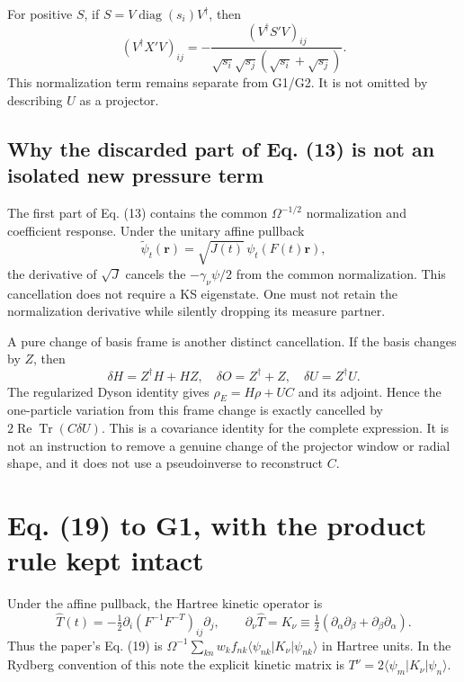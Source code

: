 \documentclass[11pt]{article}
\newcommand{\Tr}{\operatorname{Tr}}
\newcommand{\Rea}{\operatorname{Re}}
\begin{document}
For positive $S$, if $S=V\operatorname{diag}(s_i)V^\dagger$, then
\begin{equation}
 (V^\dagger X'V)_{ij}=-\frac{(V^\dagger S'V)_{ij}}
 {\sqrt{s_i}\sqrt{s_j}(\sqrt{s_i}+\sqrt{s_j})}.
\end{equation}
This normalization term remains separate from G1/G2. It is not omitted by describing $U$ as a projector.

\subsection{Why the discarded part of Eq. (13) is not an isolated new pressure term}
The first part of Eq. (13) contains the common $\Omega^{-1/2}$ normalization and coefficient response. Under the unitary affine pullback
\begin{equation}
 \widetilde\psi_t(\bm r)=\sqrt{J(t)}\,\psi_t(F(t)\bm r),
\end{equation}
the derivative of $\sqrt J$ cancels the $-\gamma_\nu\psi/2$ from the common normalization. This cancellation does not require a KS eigenstate. One must not retain the normalization derivative while silently dropping its measure partner.

A pure change of basis frame is another distinct cancellation. If the basis changes by $Z$, then
\begin{equation}
 \delta H=Z^\dagger H+HZ,\quad\delta O=Z^\dagger+Z,\quad\delta U=Z^\dagger U .
\end{equation}
The regularized Dyson identity gives $\rho_E=H\rho+UC$ and its adjoint. Hence the one-particle variation from this frame change is exactly cancelled by $2\Rea\Tr(C\delta U)$. This is a covariance identity for the complete expression. It is not an instruction to remove a genuine change of the projector window or radial shape, and it does not use a pseudoinverse to reconstruct $C$.

\section{Eq. (19) to G1, with the product rule kept intact}
Under the affine pullback, the Hartree kinetic operator is
\begin{equation}
 \widehat T(t)=-\tfrac12\partial_i(F^{-1}F^{-T})_{ij}\partial_j,
 \qquad \partial_\nu\widehat T=K_\nu\equiv
 \tfrac12(\partial_\alpha\partial_\beta+\partial_\beta\partial_\alpha).
\end{equation}
Thus the paper's Eq. (19) is $\Omega^{-1}\sum_{kn}w_k f_{nk}\langle\psi_{nk}|K_\nu|\psi_{nk}\rangle$ in Hartree units. In the Rydberg convention of this note the explicit kinetic matrix is $T^\nu=2\langle\psi_m|K_\nu|\psi_n\rangle$.
\end{document}
